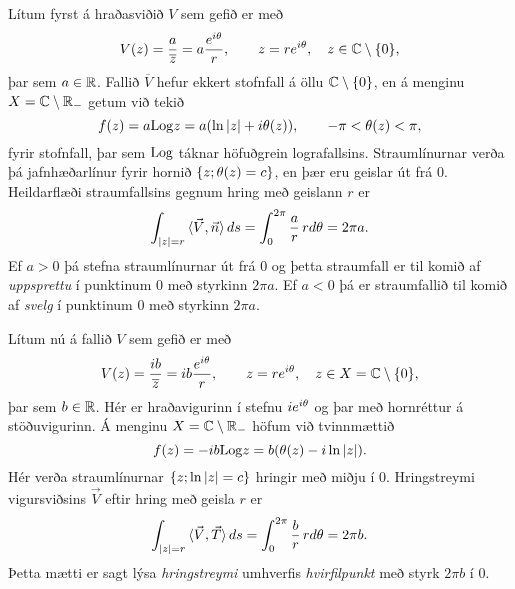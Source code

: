 \begin{sy}  Lítum fyrst á hraðasviðið $V$ sem gefið er með 
 \begin{equation*}V(z)=\dfrac a{\overline z}= a\dfrac {e\sp{i\theta}}r, \qquad
z=re\sp{i\theta}, \quad z\in {\mathbb C}\setminus{\{0\}},
\label{4.7.7}
 \end{equation*}
þar sem $a\in {\mathbb R}$. Fallið $\overline V$ hefur ekkert stofnfall á öllu 
${\mathbb C}\setminus {\{0\}}$, en á menginu $X={\mathbb C}\setminus {\mathbb R}_-$ getum við tekið 
 $$f(z)=a{\operatorname{Log}} z=a(\ln |z|+i\theta(z)),  \qquad -\pi<\theta(z)<\pi,
 $$
fyrir stofnfall, þar sem ${\operatorname{Log}}$ táknar höfuðgrein lografallsins.
Straumlínurnar verða þá jafnhæðarlínur fyrir hornið ${\{z;
\theta(z)=c\}}$, en þær eru geislar út frá $0$.  Heildarflæði
straumfallsins gegnum hring með geislann $r$ er
 $$\int_{|z|=r}{\langle\vec V,\vec n\rangle} \, ds=
\int_0\sp{2\pi}\dfrac ar \, rd\theta=2\pi a.
 $$
Ef $a>0$ þá stefna straumlínurnar út frá $0$ og 
þetta straumfall er til komið af {\it uppsprettu} í
punktinum $0$ með styrkinn $2\pi a$. Ef $a<0$ þá er 
straumfallið  til komið af {\it svelg} í punktinum $0$
með styrkinn $2\pi a$.  
\end{sy}






\begin{sy}  Lítum nú á fallið $V$ sem gefið er með 
 \begin{equation*}V(z)=\dfrac {ib}{\overline z}= ib\dfrac {e\sp{i\theta}}r, \qquad
z=re\sp{i\theta}, \quad z\in X={\mathbb C}\setminus{\{0\}},
\label{4.7.8}
 \end{equation*}
þar sem $b\in {\mathbb R}$.
Hér er hraðavigurinn í stefnu $ie\sp{i\theta}$ og þar með hornréttur
á stöðuvigurinn.  {Á}  menginu $X={\mathbb C}\setminus {\mathbb R}_-$ 
höfum við tvinnmættið  
 $$f(z)=-ib{\operatorname{Log}} z=b(\theta(z)-i\ln |z|).
 $$
Hér verða straumlínurnar ${\{z; \ln|z|=c\}}$ hringir  með miðju í
$0$.  Hringstreymi vigursviðsins $\vec V$ eftir hring með geisla $r$
er
 $$\int_{|z|=r}{\langle\vec V,\vec T\rangle} \, ds=
\int_0\sp{2\pi}\dfrac br \, rd\theta=2\pi b.
 $$
Þetta mætti er sagt lýsa {\it hringstreymi}
umhverfis {\it hvirfilpunkt} með styrk $2\pi b$ í $0$.

{}
\end{sy}




